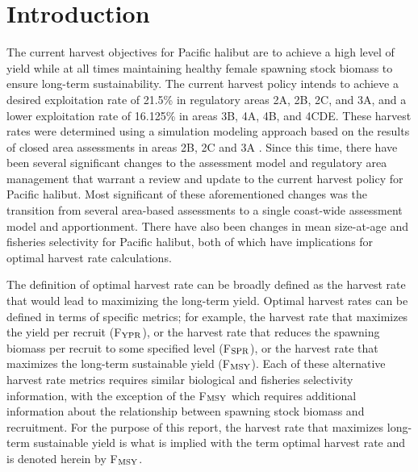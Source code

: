 % 








\section*{Introduction} %
\label{sec:introduction}
The current harvest objectives for Pacific halibut are to achieve a high level of yield while at all times maintaining healthy female spawning stock biomass to ensure long-term sustainability. The current harvest policy intends to achieve a desired exploitation rate of 21.5\% in regulatory areas 2A, 2B, 2C, and 3A, and a lower exploitation rate of 16.125\% in areas 3B, 4A, 4B, and 4CDE.  These harvest rates were determined using a simulation modeling approach based on the results of closed area assessments in areas 2B, 2C and 3A \citep{clark2006assessment}.  Since this time, there have been several significant changes to the assessment model and regulatory area management that warrant a review and update to the current harvest policy for Pacific halibut.  Most significant of these aforementioned changes was the transition from several area-based assessments to a single coast-wide assessment model and  apportionment. There have also been changes in mean size-at-age and fisheries selectivity for Pacific halibut, both of which have implications for optimal harvest rate calculations.

The definition of optimal harvest rate can be broadly defined as the harvest rate that would lead to maximizing the long-term yield.  Optimal harvest rates can be defined in terms of specific metrics; for example, the harvest rate that maximizes the yield per recruit (F$_{\rm{YPR}}$), or the harvest rate that reduces the spawning biomass per recruit to some specified level (F$_{\rm{SPR}}$), or the harvest rate that maximizes the long-term sustainable yield (F$_{\rm{MSY}}$).  Each of these alternative harvest rate metrics requires similar biological and fisheries selectivity information, with the exception of the F$_{\rm{MSY}}$ which requires additional information about the relationship between spawning stock biomass and recruitment. For the purpose of this report, the harvest rate that maximizes long-term sustainable yield is what is implied with the term optimal harvest rate and is denoted herein by F$_{\rm{MSY}}$.

